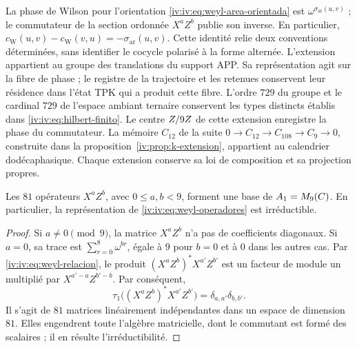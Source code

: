 La phase de Wilson pour l’orientation
\eqref{iv:iv:eq:weyl-area-orientada} est
\(\omega^{\sigma_{\mathrm{ar}}(u,v)}\) ; le commutateur de la
section ordonnée \(X^aZ^b\) publie son inverse. En particulier,
\(c_{\mathrm W}(u,v)-c_{\mathrm W}(v,u)
=-\sigma_{\mathrm{ar}}(u,v)\).
Cette identité relie deux conventions déterminées, sans identifier
le cocycle polarisé à la forme alternée. L’extension appartient
au groupe des translations du support APP. Sa représentation agit sur
la fibre de phase ; le registre de la trajectoire et les retenues conservent
leur résidence dans l’état TPK qui a produit cette fibre. L’ordre \(729\)
du groupe et le cardinal \(729\) de l’espace ambiant ternaire conservent les
types distincts établis dans \eqref{iv:iv:eq:hilbert-finito}.
Le centre \(Z/9Z\) de cette extension enregistre la phase
du commutateur. La mémoire \(C_{12}\) de la suite
\(0\to C_{12}\to C_{108}\to C_9\to0\), construite dans la
proposition~\ref{iv:prop:k-extension}, appartient au calendrier
dodécaphasique. Chaque extension conserve sa loi de composition et
sa projection propres.

\begin{proposition}
\label{iv:iv:prop:weyl-completo}
Les \(81\) opérateurs \(X^aZ^b\), avec \(0\leq a,b<9\), forment
une base de \(A_1=M_9(C)\). En particulier, la
représentation de \eqref{iv:iv:eq:weyl-operadores} est irréductible.
\end{proposition}
\begin{proof}
Si \(a\neq0\pmod9\), la matrice \(X^aZ^b\) n’a pas de coefficients
diagonaux. Si \(a=0\), sa trace est
\(\sum_{r=0}^8\omega^{br}\), égale à \(9\) pour \(b=0\) et à
\(0\) dans les autres cas. Par \eqref{iv:iv:eq:weyl-relacion}, le
produit \((X^aZ^b)^*X^{a'}Z^{b'}\) est un facteur de module un
multiplié par \(X^{a'-a}Z^{b'-b}\). Par conséquent,
\[
 \tau_1\bigl((X^aZ^b)^*X^{a'}Z^{b'}\bigr)
 =\delta_{a,a'}\delta_{b,b'}.
\]
Il s'agit de \(81\) matrices linéairement indépendantes dans un espace de dimension \(81\). Elles engendrent toute l'algèbre matricielle, dont le commutant est formé des scalaires ; il en résulte l'irréductibilité.
\end{proof}


